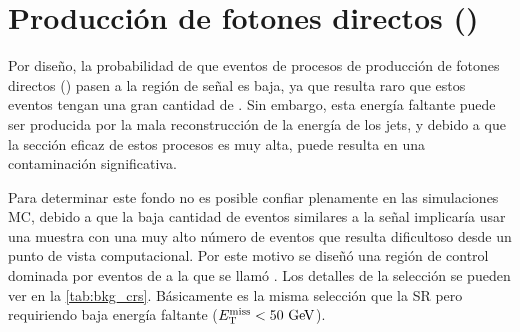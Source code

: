 \section{Producción de fotones directos (\gjet)}
\label{sec:bkg_gjet}

Por diseño, la probabilidad de que eventos de procesos de producción de fotones
directos ({\gjet}) pasen a la región de señal es
baja, ya que resulta raro que estos eventos tengan una gran cantidad de {\met}.
Sin embargo, esta energía faltante puede ser producida por la mala
reconstrucción de la energía de los jets, y debido a que la sección eficaz de
estos procesos es muy alta, puede resulta en una contaminación significativa.

Para determinar este fondo no es posible confiar plenamente en las simulaciones
MC, debido a que la baja cantidad de eventos similares a la señal implicaría
usar una muestra con una muy alto número de eventos que resulta dificultoso desde un
punto de vista computacional. Por este motivo se diseñó
una región de control dominada por eventos de {\gjet} a la que se llamó {\CRQ}.
Los detalles de la selección se pueden ver en la \cref{tab:bkg_crs}. Básicamente
es la misma selección que la SR pero requiriendo baja energía faltante ($\met <
50 \gev$).



